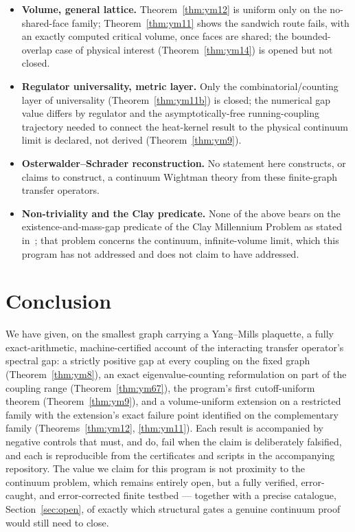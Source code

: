 \documentclass[aps,prd,twocolumn,superscriptaddress,nofootinbib]{revtex4-2}
\begin{document}
\begin{itemize}
\item \textbf{Volume, general lattice.} Theorem~\ref{thm:ym12} is uniform
only on the no-shared-face family; Theorem~\ref{thm:ym11} shows the
sandwich route fails, with an exactly computed critical volume, once
faces are shared; the bounded-overlap case of physical interest
(Theorem~\ref{thm:ym14}) is opened but not closed.
\item \textbf{Regulator universality, metric layer.} Only the
combinatorial/counting layer of universality (Theorem~\ref{thm:ym11b})
is closed; the numerical gap value differs by regulator and the
asymptotically-free running-coupling trajectory needed to connect the
heat-kernel result to the physical continuum limit is declared, not
derived (Theorem~\ref{thm:ym9}).
\item \textbf{Osterwalder--Schrader reconstruction.} No statement here
constructs, or claims to construct, a continuum Wightman theory from
these finite-graph transfer operators.
\item \textbf{Non-triviality and the Clay predicate.} None of the above
bears on the existence-and-mass-gap predicate of the Clay Millennium
Problem as stated in~\cite{JaffeWitten}; that problem concerns the
continuum, infinite-volume limit, which this program has not
addressed and does not claim to have addressed.
\end{itemize}

\section{Conclusion}\label{sec:conclusion}

We have given, on the smallest graph carrying a Yang--Mills plaquette, a
fully exact-arithmetic, machine-certified account of the interacting
transfer operator's spectral gap: a strictly positive gap at every
coupling on the fixed graph (Theorem~\ref{thm:ym8}), an exact
eigenvalue-counting reformulation on part of the coupling range
(Theorem~\ref{thm:ym67}), the program's first cutoff-uniform theorem
(Theorem~\ref{thm:ym9}), and a volume-uniform extension on a restricted
family with the extension's exact failure point identified on the
complementary family (Theorems~\ref{thm:ym12}, \ref{thm:ym11}). Each
result is accompanied by negative controls that must, and do, fail when
the claim is deliberately falsified, and each is reproducible from the
certificates and scripts in the accompanying repository. The value we
claim for this program is not proximity to the continuum problem, which
remains entirely open, but a fully verified, error-caught, and
error-corrected finite testbed --- together with a precise catalogue,
Section~\ref{sec:open}, of exactly which structural gates a genuine
continuum proof would still need to close.
\end{document}
